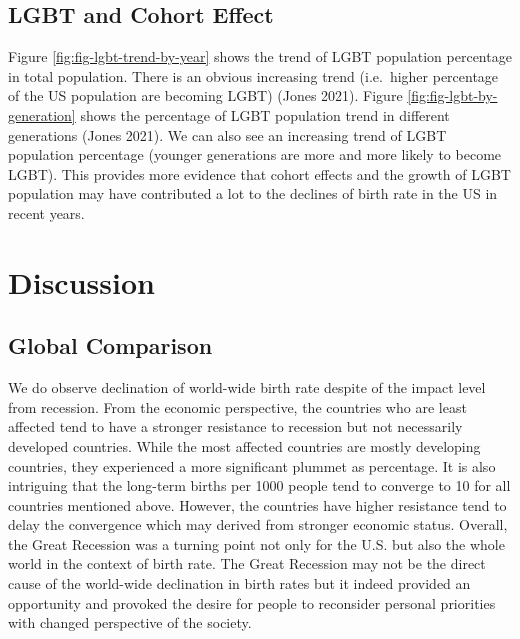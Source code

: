 \documentclass[
]{article}
\begin{document}
\hypertarget{lgbt-and-cohort-effect}{%
\subsection{LGBT and Cohort Effect}\label{lgbt-and-cohort-effect}}

Figure \ref{fig:fig-lgbt-trend-by-year} shows the trend of LGBT population percentage in total population.
There is an obvious increasing trend (i.e.~higher percentage of the US population are becoming LGBT) (Jones 2021).
Figure \ref{fig:fig-lgbt-by-generation} shows the percentage of LGBT population trend in different generations (Jones 2021).
We can also see an increasing trend of LGBT population percentage (younger generations are more and more likely to become LGBT).
This provides more evidence that cohort effects and the growth of LGBT population may have contributed a lot to the declines of birth rate in the US in recent years.

\hypertarget{discussion}{%
\section{Discussion}\label{discussion}}

\hypertarget{global-comparison}{%
\subsection{Global Comparison}\label{global-comparison}}

We do observe declination of world-wide birth rate despite of the impact level from recession. From the economic perspective, the countries who are least affected tend to have a stronger resistance to recession but not necessarily developed countries. While the most affected countries are mostly developing countries, they experienced a more significant plummet as percentage. It is also intriguing that the long-term births per 1000 people tend to converge to 10 for all countries mentioned above. However, the countries have higher resistance tend to delay the convergence which may derived from stronger economic status. Overall, the Great Recession was a turning point not only for the U.S. but also the whole world in the context of birth rate. The Great Recession may not be the direct cause of the world-wide declination in birth rates but it indeed provided an opportunity and provoked the desire for people to reconsider personal priorities with changed perspective of the society.

\newpage
\end{document}

